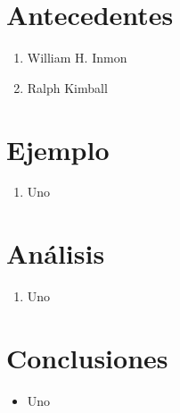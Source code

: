 \documentclass[twoside,twocolumn]{article}
\begin{document}


\section{Antecedentes}

\begin{enumerate}

 \item William H. Inmon

\item Ralph Kimball

\end{enumerate}




\section{Ejemplo}
\begin{enumerate}

 \item Uno
   
\end{enumerate}


\section{Análisis}

\begin{enumerate}

    \item Uno
\end{enumerate}


\section{Conclusiones}
\begin{itemize}	
 \item Uno

\end{itemize} 
\end{document}
